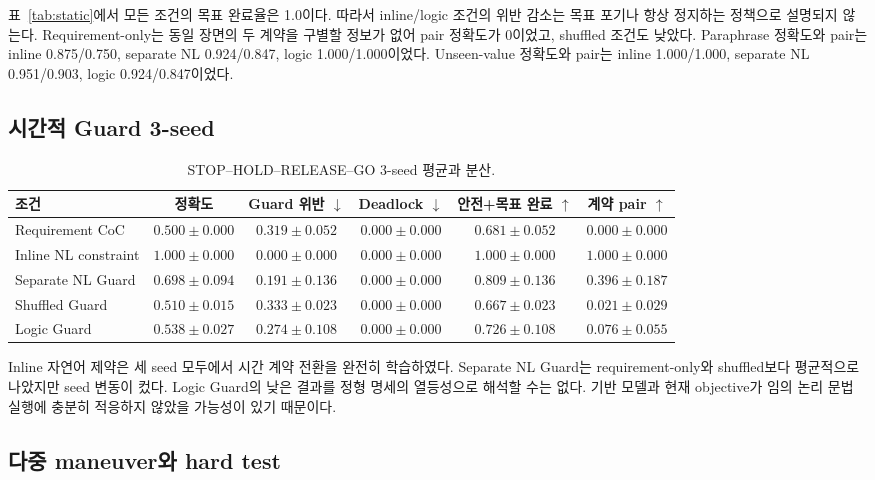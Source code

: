표~\ref{tab:static}에서 모든 조건의 목표 완료율은 1.0이다. 따라서 inline/logic 조건의 위반 감소는 목표 포기나 항상 정지하는 정책으로 설명되지 않는다. Requirement-only는 동일 장면의 두 계약을 구별할 정보가 없어 pair 정확도가 0이었고, shuffled 조건도 낮았다. Paraphrase 정확도와 pair는 inline 0.875/0.750, separate NL 0.924/0.847, logic 1.000/1.000이었다. Unseen-value 정확도와 pair는 inline 1.000/1.000, separate NL 0.951/0.903, logic 0.924/0.847이었다.

\subsection{시간적 Guard 3-seed}

\begin{table}[t]
\centering
\caption{STOP--HOLD--RELEASE--GO 3-seed 평균과 분산.}
\label{tab:temporal}
\footnotesize
\begin{tabular}{lccccc}
\toprule
조건 & 정확도 & Guard 위반 $\downarrow$ & Deadlock $\downarrow$ & 안전+목표 완료 $\uparrow$ & 계약 pair $\uparrow$ \\
\midrule
Requirement CoC & $0.500\pm0.000$ & $0.319\pm0.052$ & $0.000\pm0.000$ & $0.681\pm0.052$ & $0.000\pm0.000$ \\
Inline NL constraint & $\mathbf{1.000\pm0.000}$ & $\mathbf{0.000\pm0.000}$ & $0.000\pm0.000$ & $\mathbf{1.000\pm0.000}$ & $\mathbf{1.000\pm0.000}$ \\
Separate NL Guard & $0.698\pm0.094$ & $0.191\pm0.136$ & $0.000\pm0.000$ & $0.809\pm0.136$ & $0.396\pm0.187$ \\
Shuffled Guard & $0.510\pm0.015$ & $0.333\pm0.023$ & $0.000\pm0.000$ & $0.667\pm0.023$ & $0.021\pm0.029$ \\
Logic Guard & $0.538\pm0.027$ & $0.274\pm0.108$ & $0.000\pm0.000$ & $0.726\pm0.108$ & $0.076\pm0.055$ \\
\bottomrule
\end{tabular}
\end{table}

Inline 자연어 제약은 세 seed 모두에서 시간 계약 전환을 완전히 학습하였다. Separate NL Guard는 requirement-only와 shuffled보다 평균적으로 나았지만 seed 변동이 컸다. Logic Guard의 낮은 결과를 정형 명세의 열등성으로 해석할 수는 없다. 기반 모델과 현재 objective가 임의 논리 문법 실행에 충분히 적응하지 않았을 가능성이 있기 때문이다.

\subsection{다중 maneuver와 hard test}

